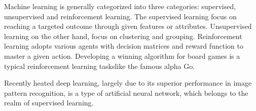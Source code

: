 Machine learning is generally categorized into three categories: supervised, unsupervised and reinforcement learning. The supervised learning focus on reaching a targeted outcome through given features or attributes. Unsupervised learning on the other hand, focus on clustering and grouping. Reinforcement learning adopts various agents with decision matrices and reward function to master a given action. Developing a winning algorithm for board games is a typical reinforcement learning taskslike the famous alpha Go.
\par
Recently heated deep learning, largely due to its superior performance in image pattern recognition, is a type of artificial neural network, which belongs to the realm of supervised learning. 
